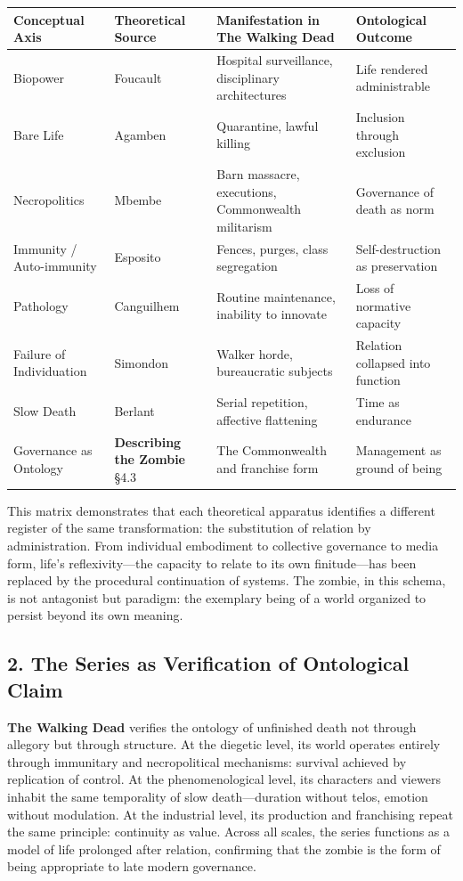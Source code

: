 \documentclass[11pt]{article}
\begin{document}
\begin{center}
\begin{tabular}{llll}
Conceptual Axis & Theoretical Source & Manifestation in \textbf{The Walking Dead} & Ontological Outcome\\
\hline
Biopower & Foucault & Hospital surveillance, disciplinary architectures & Life rendered administrable\\
Bare Life & Agamben & Quarantine, lawful killing & Inclusion through exclusion\\
Necropolitics & Mbembe & Barn massacre, executions, Commonwealth militarism & Governance of death as norm\\
Immunity / Auto-immunity & Esposito & Fences, purges, class segregation & Self-destruction as preservation\\
Pathology & Canguilhem & Routine maintenance, inability to innovate & Loss of normative capacity\\
Failure of Individuation & Simondon & Walker horde, bureaucratic subjects & Relation collapsed into function\\
Slow Death & Berlant & Serial repetition, affective flattening & Time as endurance\\
Governance as Ontology & \textbf{Describing the Zombie} §4.3 & The Commonwealth and franchise form & Management as ground of being\\
\end{tabular}
\end{center}

This matrix demonstrates that each theoretical apparatus identifies a different register of the same transformation: the substitution of relation by administration.  
From individual embodiment to collective governance to media form, life’s reflexivity—the capacity to relate to its own finitude—has been replaced by the procedural continuation of systems.  
The zombie, in this schema, is not antagonist but paradigm: the exemplary being of a world organized to persist beyond its own meaning.  
\subsection*{2. The Series as Verification of Ontological Claim}
\label{sec:org23d1113}

\textbf{The Walking Dead} verifies the ontology of unfinished death not through allegory but through structure.  
At the diegetic level, its world operates entirely through immunitary and necropolitical mechanisms: survival achieved by replication of control.  
At the phenomenological level, its characters and viewers inhabit the same temporality of slow death—duration without telos, emotion without modulation.  
At the industrial level, its production and franchising repeat the same principle: continuity as value.  
Across all scales, the series functions as a model of life prolonged after relation, confirming that the zombie is the form of being appropriate to late modern governance.  
\end{document}
